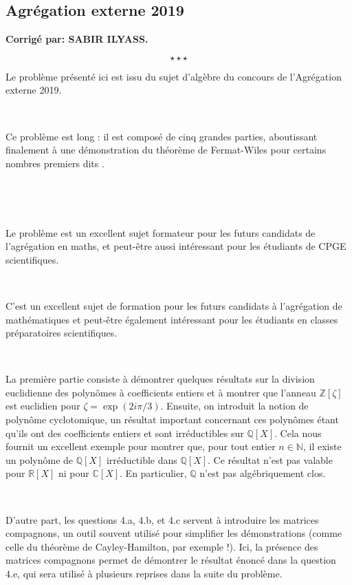 \begin{center}
\subsection*{Agr{\'e}gation externe 2019}\label{agreg}
\textbf{Corrig{\'e} par: SABIR ILYASS.}
\end{center}
\[ \star \star \star \]


Le probl{\`e}me pr{\'e}sent{\'e} ici est issu du sujet d'alg{\`e}bre du
concours de l'Agr{\'e}gation externe 2019.

\

Ce probl{\`e}me est long : il est compos{\'e} de cinq grandes parties,
aboutissant finalement {\`a} une d{\'e}monstration du th{\'e}or{\`e}me de
Fermat-Wiles pour certains nombres premiers dits {}.

\

\

Le probl{\`e}me est un excellent sujet formateur pour les futurs candidats de
l'agr{\'e}gation en maths, et peut-{\^e}tre aussi int{\'e}ressant pour les
{\'e}tudiants de CPGE scientifiques.

\

C'est un excellent sujet de formation pour les futurs candidats {\`a}
l'agr{\'e}gation de math{\'e}matiques et peut-{\^e}tre {\'e}galement
int{\'e}ressant pour les {\'e}tudiants en classes pr{\'e}paratoires
scientifiques.

\

La premi{\`e}re partie consiste {\`a} d{\'e}montrer quelques r{\'e}sultats
sur la division euclidienne des polyn{\^o}mes {\`a} coefficients entiers et
{\`a} montrer que l'anneau $\mathbb{Z}[\zeta]$ est euclidien pour $\zeta =
\exp (2 i \pi / 3)$. Ensuite, on introduit la notion de polyn{\^o}me
cyclotomique, un r{\'e}sultat important concernant ces polyn{\^o}mes {\'e}tant
qu'ils ont des coefficients entiers et sont irr{\'e}ductibles sur
$\mathbb{Q}[X] .$ Cela nous fournit un excellent exemple pour montrer que,
pour tout entier $n \in \mathbb{N}$, il existe un polyn{\^o}me de
\ensuremath{\mathbb{Q}}$[X]$ irr{\'e}ductible dans $\mathbb{Q}[X]$. Ce
r{\'e}sultat n'est pas valable pour \ensuremath{\mathbb{R}}$[X]$ ni pour
$\mathbb{C}[X]$. En particulier, \ensuremath{\mathbb{Q}} n'est pas
alg{\'e}briquement clos.

\

D'autre part, les questions 4.a, 4.b, et 4.c servent {\`a} introduire les
matrices compagnons, un outil souvent utilis{\'e} pour simplifier les
d{\'e}monstrations (comme celle du th{\'e}or{\`e}me de Cayley-Hamilton, par
exemple !). Ici, la pr{\'e}sence des matrices compagnons permet de
d{\'e}montrer le r{\'e}sultat {\'e}nonc{\'e} dans la question 4.e, qui sera
utilis{\'e} {\`a} plusieurs reprises dans la suite du probl{\`e}me.

